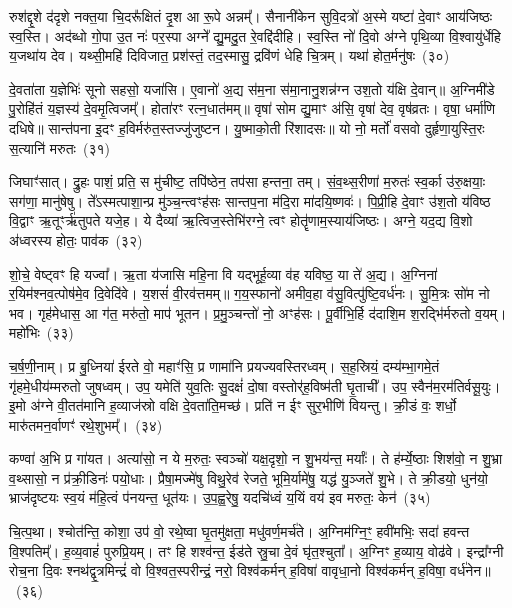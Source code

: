 रुश॑द्दृ॒शे द॑दृशे नक्त॒या चि॒दरू᳚क्षितं दृ॒श आ रू॒पे अन्नम्᳚। सैनानी॑केन सुवि॒दत्रो॑ अ॒स्मे यष्टा॑ दे॒वाꣳ आय॑जिष्ठः स्व॒स्ति। अद॑ब्धो गो॒पा उ॒त नः॑ पर॒स्पा अग्ने᳚ द्यु॒मदु॒त रे॒वद्दि॑दीहि। स्व॒स्ति नो॑ दि॒वो अ॑ग्ने पृथि॒व्या वि॒श्वायु॑र्धेहि य॒जथा॑य देव। यथ्सी॒महि॑ दिविजात॒ प्रश॑स्तं॒ तद॒स्मासु॒ द्रवि॑णं धेहि चि॒त्रम्। यथा॑ होत॒र्मनु॑षः~(३०)

दे॒वता॑ता य॒ज्ञेभिः॑ सूनो सहसो॒ यजा॑सि। ए॒वानो॑ अ॒द्य स॑म॒ना स॑मा॒नानु॒शन्न॑ग्न उश॒तो य॑क्षि दे॒वान्॥ अ॒ग्निमी॑डे पु॒रोहि॑तं य॒ज्ञस्य॑ दे॒वमृ॒त्विजम्᳚। होता॑रꣳ रत्न॒धात॑मम्॥ वृषा॑ सोम द्यु॒माꣳ अ॑सि॒ वृषा॑ देव॒ वृष॑व्रतः। वृषा॒ धर्मा॑णि दधिषे॥ सान्त॑पना इ॒दꣳ ह॒विर्मरु॑त॒स्तज्जु॑जुष्टन। यु॒ष्माको॒ती रि॑शादसः॥ यो नो॒ मर्तो॑ वसवो दुर्\mbox{}हृणा॒युस्ति॒रः स॒त्यानि॑ मरुतः~(३१)

जिघाꣳ॑सात्। द्रु॒हः पाशं॒ प्रति॒ स मु॑चीष्ट॒ तपि॑ष्ठेन॒ तप॑सा हन्तना॒ तम्। सं॒व॒थ्स॒रीणा॑ म॒रुतः॑ स्व॒र्का उ॑रु॒क्षयाः॒ सग॑णा॒ मानु॑षेषु। ते᳚\-ऽस्मत्पाशा॒न्प्र मु॑ञ्च॒न्त्वꣳह॑सः सान्तप॒ना म॑दि॒रा मा॑दयि॒ष्णवः॑। पि॒प्री॒हि दे॒वाꣳ उ॑श॒तो य॑विष्ठ वि॒द्वाꣳ ऋ॒तूꣳर्\mbox{}ऋ॑तुपते यजे॒ह। ये दैव्या॑ ऋ॒त्विज॒स्तेभि॑रग्ने॒ त्वꣳ होतॄ॑णाम॒स्याय॑जिष्ठः। अग्ने॒ यद॒द्य वि॒शो अ॑ध्वरस्य होतः॒ पाव॑क~(३२)

शो॒चे॒ वेष्ट्वꣳ हि यज्वा᳚। ऋ॒ता य॑जासि महि॒ना वि यद्भूर्\mbox{}ह॒व्या व॑ह यविष्ठ॒ या ते॑ अ॒द्य। अ॒ग्निना॑ र॒यिम॑श्नव॒त्पोष॑मे॒व दि॒वेदि॑वे। य॒शसं॑ वी॒रव॑त्तमम्॥ ग॒य॒स्फानो॑ अमीव॒हा व॑सु॒वित्पु॑ष्टि॒वर्ध॑नः। सु॒मि॒त्रः सो॑म नो भव। गृह॑मेधास॒ आ ग॑त॒ मरु॑तो॒ माप॑ भूतन। प्र॒मु॒ञ्चन्तो॑ नो॒ अꣳह॑सः। पू॒र्वीभि॒र्\mbox{}हि द॑दाशि॒म श॒रद्भि॑र्मरुतो व॒यम्। महो॑भिः~(३३)

च॒र्\mbox{}ष॒णी॒नाम्। प्र बु॒ध्निया॑ ईरते वो॒ महाꣳ॑सि॒ प्र णामा॑नि प्रयज्यवस्तिरध्वम्। स॒ह॒स्रियं॒ दम्य॑म्भा॒गमे॒तं गृ॑हमे॒धीय॑म्मरुतो जुषध्वम्। उप॒ यमेति॑ युव॒तिः सु॒दक्षं॑ दो॒षा वस्तोर्॑\mbox{}ह॒विष्म॑ती घृ॒ताची᳚। उप॒ स्वैन॑म॒रम॑तिर्वसू॒युः। इ॒मो अ॑ग्ने वी॒तत॑मानि ह॒व्याज॑स्रो वक्षि दे॒वता॑ति॒मच्छ॑। प्रति॑ न ईꣳ सुर॒भीणि॑ वियन्तु। क्री॒डं वः॒ शर्धो॒ मारु॑तमन॒र्वाणꣳ॑ रथे॒शुभम्᳚।~(३४)

कण्वा॑ अ॒भि प्र गा॑यत। अत्या॑सो॒ न ये म॒रुतः॒ स्वञ्चो॑ यक्ष॒दृशो॒ न शु॒भय॑न्त॒ मर्याः᳚। ते ह॑र्म्ये॒ष्ठाः शिश॑वो॒ न शु॒भ्रा व॒थ्सासो॒ न प्र॑क्री॒डिनः॑ पयो॒धाः। प्रैषा॒मज्मे॑षु विथु॒रेव॑ रेजते॒ भूमि॒र्यामे॑षु॒ यद्ध॑ यु॒ञ्जते॑ शु॒भे। ते क्री॒डयो॒ धुन॑यो॒ भ्राज॑दृष्टयः स्व॒यं म॑हि॒त्वं प॑नयन्त॒ धूत॑यः। उ॒प॒ह्व॒रेषु॒ यदचि॑ध्वं य॒यिं वय॑ इव मरुतः॒ केन॑~(३५)

चि॒त्प॒था। श्चोत॑न्ति॒ कोशा॒ उप॑ वो॒ रथे॒ष्वा घृ॒तमु॑क्षता॒ मधु॑वर्ण॒मर्च॑ते। अ॒ग्निम॑ग्नि॒ꣳ॒ हवी॑मभिः॒ सदा॑ हवन्त वि॒श्पतिम्᳚। ह॒व्य॒वाहं॑ पुरुप्रि॒यम्। तꣳ हि शश्व॑न्त॒ ईड॑ते स्रु॒चा दे॒वं घृ॑त॒श्चुता᳚। अ॒ग्निꣳ ह॒व्याय॒ वोढ॑वे। इन्द्रा᳚ग्नी रोच॒ना दि॒वः श्नथ॑द्वृ॒त्रमिन्द्रं॑ वो वि॒श्वत॒स्परीन्द्रं॒ नरो॒ विश्व॑कर्मन् ह॒विषा॑ वावृधा॒नो विश्व॑कर्मन् ह॒विषा॒ वर्ध॑नेन॥~(३६)

